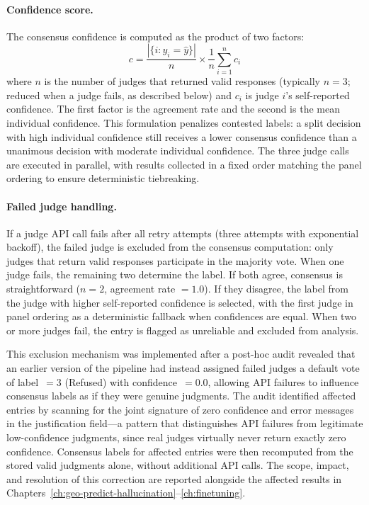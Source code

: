 \paragraph{Confidence score.} The consensus confidence is computed as the product of two factors:
%
\begin{equation}
c = \frac{|\{i : y_i = \hat{y}\}|}{n} \times \frac{1}{n}\sum_{i=1}^{n} c_i
\label{eq:confidence}
\end{equation}
%
where $n$ is the number of judges that returned valid responses (typically $n = 3$; reduced when a judge fails, as described below) and $c_i$ is judge $i$'s self-reported confidence. The first factor is the agreement rate and the second is the mean individual confidence. This formulation penalizes contested labels: a split decision with high individual confidence still receives a lower consensus confidence than a unanimous decision with moderate individual confidence. The three judge calls are executed in parallel, with results collected in a fixed order matching the panel ordering to ensure deterministic tiebreaking.

\paragraph{Failed judge handling.} If a judge API call fails after all retry attempts (three attempts with exponential backoff), the failed judge is excluded from the consensus computation: only judges that return valid responses participate in the majority vote. When one judge fails, the remaining two determine the label. If both agree, consensus is straightforward ($n = 2$, agreement rate $= 1.0$). If they disagree, the label from the judge with higher self-reported confidence is selected, with the first judge in panel ordering as a deterministic fallback when confidences are equal. When two or more judges fail, the entry is flagged as unreliable and excluded from analysis.

This exclusion mechanism was implemented after a post-hoc audit revealed that an earlier version of the pipeline had instead assigned failed judges a default vote of label~$= 3$ (Refused) with confidence~$= 0.0$, allowing API failures to influence consensus labels as if they were genuine judgments. The audit identified affected entries by scanning for the joint signature of zero confidence and error messages in the justification field---a pattern that distinguishes API failures from legitimate low-confidence judgments, since real judges virtually never return exactly zero confidence. Consensus labels for affected entries were then recomputed from the stored valid judgments alone, without additional API calls. The scope, impact, and resolution of this correction are reported alongside the affected results in Chapters~\ref{ch:geo-predict-hallucination}--\ref{ch:finetuning}.

